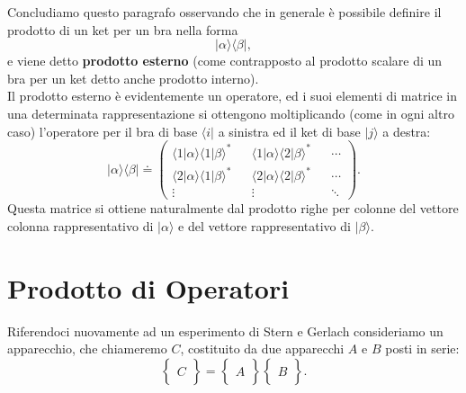 \documentclass[a4paper,12pt,oneside]{book}
\begin{document}
Concludiamo questo paragrafo osservando che in generale è possibile definire il prodotto di un ket per un bra nella forma
	\begin{equation}
		\boxed{\boxed{
			| \alpha \rangle \langle \beta |  ,
			}}
	\end{equation}
e viene detto \textbf{prodotto esterno} (come contrapposto al prodotto scalare di un bra per un ket detto anche prodotto interno).\\
Il prodotto esterno è evidentemente un operatore, ed i suoi elementi di matrice in una determinata rappresentazione si ottengono moltiplicando (come in ogni altro caso) l'operatore per il bra di base $\langle i |$ a sinistra ed il ket di base $| j \rangle$ a destra:
	\begin{equation}
		\boxed{
			| \alpha \rangle \langle \beta | \doteq
			\begin{pmatrix}
			\langle 1 | \alpha \rangle \langle 1 | \beta \rangle ^* && \langle 1 | \alpha \rangle \langle 2 | \beta \rangle ^* && \cdots \\
			\langle 2 | \alpha \rangle \langle 1 | \beta \rangle ^* && \langle 2 | \alpha \rangle \langle 2 | \beta \rangle ^* &&  \cdots \\
			\vdots && \vdots && \ddots
			\end{pmatrix} .
			}
	\end{equation}
Questa matrice si ottiene naturalmente dal prodotto righe per colonne del vettore colonna rappresentativo di $| \alpha \rangle$ e del vettore rappresentativo di $| \beta \rangle$.
\section{Prodotto di Operatori}

Riferendoci nuovamente ad un esperimento di Stern e Gerlach consideriamo un apparecchio, che chiameremo $C$, costituito da due apparecchi $A$ e $B$ posti in serie:
	\begin{equation}
		\begin{Bmatrix}
		\ \\ C \\ \
		\end{Bmatrix}=
		\begin{Bmatrix}
		\ \\ A \\ \
		\end{Bmatrix}
		\begin{Bmatrix}
		\ \\ B \\ \
		\end{Bmatrix} .
	\end{equation}
\end{document}
